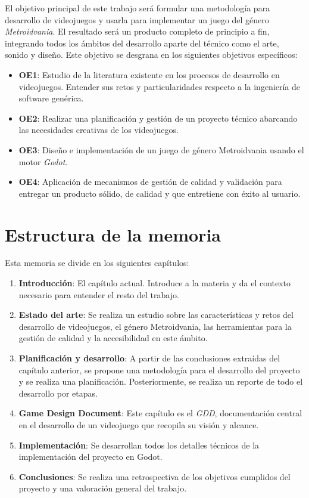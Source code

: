 El objetivo principal de este trabajo será formular una metodología para desarrollo de videojuegos y usarla para implementar un juego del género \textit{Metroidvania}. El resultado será un producto completo de principio a fin, integrando todos los ámbitos del desarrollo aparte del técnico como el arte, sonido y diseño. Este objetivo se desgrana en los siguientes objetivos específicos:

\begin{itemize}
    \item \textbf{OE1}: Estudio de la literatura existente en los procesos de desarrollo en videojuegos. Entender sus retos y particularidades respecto a la ingeniería de software genérica.
    \item \textbf{OE2}: Realizar una planificación y gestión de un proyecto técnico abarcando las necesidades creativas de los videojuegos.
    \item \textbf{OE3}: Diseño e implementación de un juego de género Metroidvania usando el motor \textit{Godot}.
    \item \textbf{OE4}: Aplicación de mecanismos de gestión de calidad y validación para entregar un producto sólido, de calidad y que entretiene con éxito al usuario.
\end{itemize} 

\section{Estructura de la memoria}

Esta memoria se divide en los siguientes capítulos:

\begin{enumerate}
    \item \textbf{Introducción}: El capítulo actual. Introduce a la materia y da el contexto necesario para entender el resto del trabajo.
    \item \textbf{Estado del arte}: Se realiza un estudio sobre las características y retos del desarrollo de videojuegos, el género Metroidvania, las herramientas para la gestión de calidad y la accesibilidad en este ámbito.
    \item \textbf{Planificación y desarrollo}: A partir de las conclusiones extraídas del capítulo anterior, se propone una metodología para el desarrollo del proyecto y se realiza una planificación. Posteriormente, se realiza un reporte de todo el desarrollo por etapas.
    \item \textbf{Game Design Document}: Este capítulo es el \textit{GDD}, documentación central en el desarrollo de un videojuego que recopila su visión y alcance.
    \item \textbf{Implementación}: Se desarrollan todos los detalles técnicos de la implementación del proyecto en Godot.
    \item \textbf{Conclusiones}: Se realiza una retrospectiva de los objetivos cumplidos del proyecto y una valoración general del trabajo.
\end{enumerate}